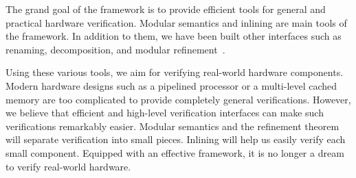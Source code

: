 The grand goal of the \Kami{} framework is to provide efficient tools
for general and practical hardware verification. Modular semantics and
inlining are main tools of the framework. In addition to them, we have
been built other interfaces such as renaming, decomposition, and
modular refinement~\cite{murali-thesis}.

Using these various tools, we aim for verifying real-world hardware
components. Modern hardware designs such as a pipelined processor or a
multi-level cached memory are too complicated to provide completely
general verifications. However, we believe that efficient and
high-level verification interfaces can make such verifications
remarkably easier. Modular semantics and the refinement theorem will
separate verification into small pieces. Inlining will help us easily
verify each small component. Equipped with an effective framework, it
is no longer a dream to verify real-world hardware.

